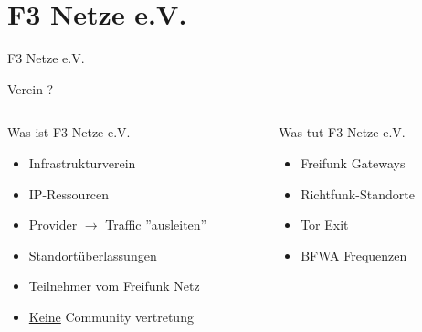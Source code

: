 \section{F3 Netze e.V.}

\begin{frame}{}
    \begin{center}
        F3 Netze e.V.
     \end{center}
\end{frame}

\begin{frame}{Verein ?}
    \begin{columns}[T]
        \begin{column}{0.45\textwidth}
            Was ist F3 Netze e.V.
            \begin{itemize}
                \item Infrastrukturverein
                \item IP-Ressourcen
                \item Provider $\rightarrow$ Traffic ''ausleiten''
                \item Standortüberlassungen
                \item Teilnehmer vom Freifunk Netz
                \item \underline{Keine} Community vertretung
            \end{itemize}
        \end{column}
        \begin{column}{0.45\textwidth}
            Was tut F3 Netze e.V.
            \begin{itemize}
                \item Freifunk Gateways
                \item Richtfunk-Standorte
                \item Tor Exit
                \item BFWA Frequenzen
            \end{itemize}
        \end{column}
    \end{columns}
\end{frame}

